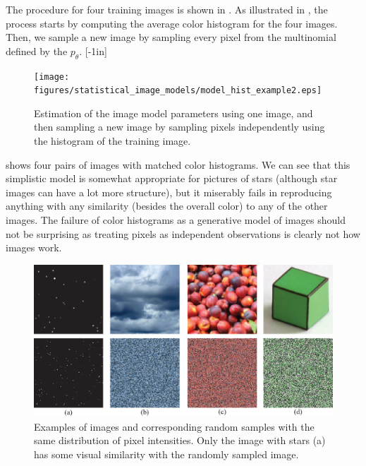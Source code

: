 The procedure for four training images is shown in \fig{\ref{fig:model_hist_example}}. As illustrated in \fig{\ref{fig:model_hist_example}}, the process starts by computing the average color histogram for the four images. Then, we sample a new image by sampling every pixel from the multinomial defined by the $p_{\theta}$. [-1in]


\begin{figure}
\centerline{
\texttt{[image: figures/statistical\_image\_models/model\_hist\_example2.eps]}
} 
\caption{Estimation of the image model parameters using one image, and then sampling a new image by sampling pixels independently using the histogram of the training image.}
\label{fig:model_hist_example}
\end{figure}

 \Fig{\ref{fig:histMatch}} shows four pairs of images with matched color histograms. We can see that this simplistic model is somewhat appropriate for pictures of stars (although star images can have a lot more structure), but it miserably fails in reproducing anything with any similarity (besides the overall color) to any of the other images. The failure of color histograms as a generative model of images should not be surprising as treating pixels as independent observations is clearly not how images work. 


\begin{figure}
\centerline{
\includegraphics[width=1\linewidth]{figures/statistical_image_models/4_examples_images.eps}
} 
\caption{Examples of images and corresponding random samples with the same distribution of pixel intensities. Only the image with stars (a) has some visual similarity with the randomly sampled image.}
\label{fig:histMatch}
\end{figure}

